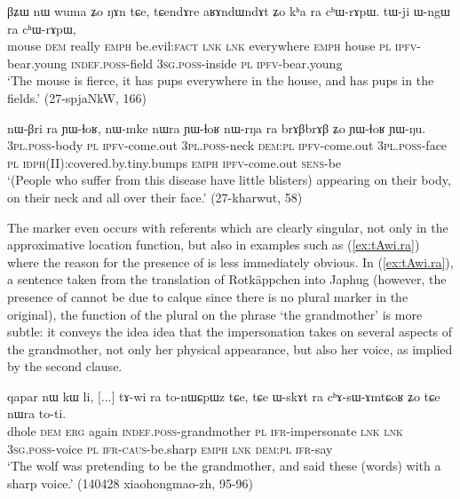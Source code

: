 \begin{exe}
\ex \label{ex:kha.ra}
\gll βʑɯ nɯ wuma ʑo ŋɤn tɕe, tɕendɤre aʁɤndɯndɤt ʑo kʰa ra cʰɯ-rɤpɯ. tɯ-ji ɯ-ngɯ ra cʰɯ-rɤpɯ, \\
mouse \textsc{dem} really \textsc{emph} be.evil:\textsc{fact} \textsc{lnk} \textsc{lnk} everywhere \textsc{emph} house \textsc{pl} \textsc{ipfv}-bear.young \textsc{indef}.\textsc{poss}-field \textsc{3sg}.\textsc{poss}-inside \textsc{pl}  \textsc{ipfv}-bear.young \\
\glt `The mouse is fierce, it has pups everywhere in the house, and has pups in the fields.' (27-spjaNkW, 166)
\end{exe} 

\begin{exe}
\ex \label{ex:nWrNa.ra}
\gll nɯ-βri ra ɲɯ-ɬoʁ, nɯ-mke nɯra ɲɯ-ɬoʁ nɯ-rŋa ra brɤβbrɤβ ʑo ɲɯ-ɬoʁ ɲɯ-ŋu. \\
\textsc{3pl}.\textsc{poss}-body \textsc{pl} \textsc{ipfv}-come.out \textsc{3pl}.\textsc{poss}-neck \textsc{dem}:\textsc{pl} \textsc{ipfv}-come.out \textsc{3pl}.\textsc{poss}-face \textsc{pl} \textsc{idph}(II):covered.by.tiny.bumps \textsc{emph} \textsc{ipfv}-come.out  \textsc{sens}-be \\
\glt `(People who suffer from this disease have little blisters) appearing on their body, on their neck and all over their face.' (27-kharwut, 58)
\end{exe} 

The marker  even occurs with referents which are clearly singular, not only in the approximative location function, but also in examples such as (\ref{ex:tAwi.ra}) where the reason for the presence of  is less immediately obvious. In (\ref{ex:tAwi.ra}), a sentence taken from the translation of Rotkäppchen into Japhug (however, the presence of  cannot be due to calque since there is no plural marker in the original), the function of the plural on the phrase  `the grandmother' is more subtle: it conveys the idea idea that the impersonation takes on several aspects of the grandmother, not only her physical appearance, but also her voice, as implied by the second clause. 

\begin{exe}
\ex \label{ex:tAwi.ra}
\gll  qapar nɯ kɯ li, [...] tɤ-wi ra to-nɯɕpɯz tɕe, tɕe ɯ-skɤt ra cʰɤ-sɯ-ɤmtɕoʁ ʑo tɕe nɯra to-ti. \\
dhole \textsc{dem} \textsc{erg} again { } \textsc{indef}.\textsc{poss}-grandmother \textsc{pl} \textsc{ifr}-impersonate \textsc{lnk} \textsc{lnk} \textsc{3sg}.\textsc{poss}-voice \textsc{pl} \textsc{ifr}-\textsc{caus}-be.sharp \textsc{emph} \textsc{lnk} \textsc{dem}:\textsc{pl} \textsc{ifr}-say \\
\glt `The wolf was pretending to be the grandmother, and said these (words) with a sharp voice.' (140428 xiaohongmao-zh, 95-96)
\end{exe} 

